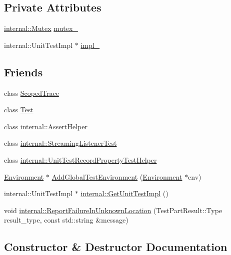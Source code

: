 \subsection*{Private Attributes}
\begin{DoxyCompactItemize}
\item 
\hyperlink{classtesting_1_1internal_1_1Mutex}{internal\+::\+Mutex} \hyperlink{classtesting_1_1UnitTest_abb94ef45cf0ab43be81ac6d5b1364132}{mutex\+\_\+}
\item 
internal\+::\+Unit\+Test\+Impl $\ast$ \hyperlink{classtesting_1_1UnitTest_a834685f92009d21b21a7307f4cbfb6e5}{impl\+\_\+}
\end{DoxyCompactItemize}
\subsection*{Friends}
\begin{DoxyCompactItemize}
\item 
class \hyperlink{classtesting_1_1UnitTest_ada54bdd5bdc24f39b9ca16807326654a}{Scoped\+Trace}
\item 
class \hyperlink{classtesting_1_1UnitTest_a5b78b1c2e1fa07ffed92da365593eaa4}{Test}
\item 
class \hyperlink{classtesting_1_1UnitTest_a183151aa061362c87572e743fe233db1}{internal\+::\+Assert\+Helper}
\item 
class \hyperlink{classtesting_1_1UnitTest_adc037d188dab349a94868991955c9cd4}{internal\+::\+Streaming\+Listener\+Test}
\item 
class \hyperlink{classtesting_1_1UnitTest_ae970f89a9f477a349fe5778be85ef42e}{internal\+::\+Unit\+Test\+Record\+Property\+Test\+Helper}
\item 
\hyperlink{classtesting_1_1Environment}{Environment} $\ast$ \hyperlink{classtesting_1_1UnitTest_a5ec26e4c31220ff8e769cc09689a4d6d}{Add\+Global\+Test\+Environment} (\hyperlink{classtesting_1_1Environment}{Environment} $\ast$env)
\item 
internal\+::\+Unit\+Test\+Impl $\ast$ \hyperlink{classtesting_1_1UnitTest_a56e56be7066957d612e53b5c60f6ac08}{internal\+::\+Get\+Unit\+Test\+Impl} ()
\item 
void \hyperlink{classtesting_1_1UnitTest_a73f5a158c13793b90c80d854c9a75120}{internal\+::\+Report\+Failure\+In\+Unknown\+Location} (Test\+Part\+Result\+::\+Type result\+\_\+type, const std\+::string \&message)
\end{DoxyCompactItemize}


\subsection{Constructor \& Destructor Documentation}
\mbox{\label{classtesting_1_1UnitTest_a5e646d37f980429c310af696c8775f5c}} 
